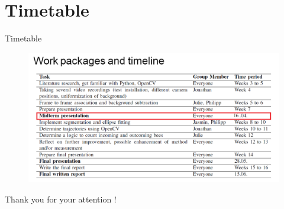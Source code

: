 \documentclass{beamer}
\begin{document}
\section{Timetable}
\begin{frame}{Timetable}
\centering
\begin{figure}
\includegraphics[scale=0.4]{pictures/timeline}
\end{figure}
\end{frame}

\begin{frame}{}
\centering
\Huge{Thank you for your attention !}
\end{frame}
\end{document}
